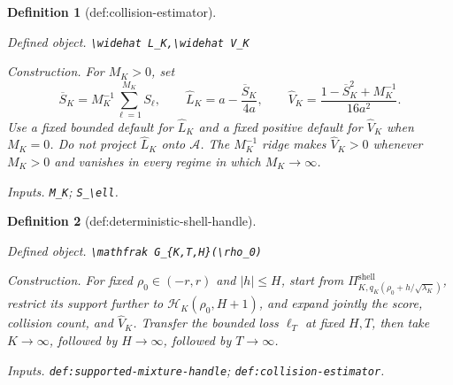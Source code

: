 \documentclass{article}
\newtheorem{definition}{Definition}
\begin{document}
\begin{definition}[def:collision-estimator]\label{def:collision-estimator}
\par\smallskip\noindent\emph{Defined object.} \texttt{\textbackslash{}\allowbreak{}widehat L\_\allowbreak{}K,\allowbreak{}\textbackslash{}\allowbreak{}widehat V\_\allowbreak{}K}
\par\smallskip\noindent\emph{Construction.} For \(M_K>0\), set
\[
 \overline S_K=M_K^{-1}\sum_{\ell=1}^{M_K}S_\ell,\qquad
 \widehat L_K=a-\frac{\overline S_K}{4a},\qquad
 \widehat V_K=\frac{1-\overline S_K^2+M_K^{-1}}{16a^2}.
\]
Use a fixed bounded default for \(\widehat L_K\) and a fixed positive default for \(\widehat V_K\) when \(M_K=0\).  Do not project \(\widehat L_K\) onto \(\mathcal A\).  The \(M_K^{-1}\) ridge makes \(\widehat V_K>0\) whenever \(M_K>0\) and vanishes in every regime in which \(M_K\to\infty\).
\par\smallskip\noindent\emph{Inputs.} \texttt{M\_\allowbreak{}K}; \texttt{S\_\allowbreak{}\textbackslash{}\allowbreak{}ell}.
\end{definition}

\begin{definition}[def:deterministic-shell-handle]\label{def:deterministic-shell-handle}
\par\smallskip\noindent\emph{Defined object.} \texttt{\textbackslash{}\allowbreak{}mathfrak G\_\allowbreak{}\{K,\allowbreak{}T,\allowbreak{}H\}\allowbreak{}(\textbackslash{}\allowbreak{}rho\_\allowbreak{}0)}
\par\smallskip\noindent\emph{Construction.} For fixed \(\rho_0\in(-r,r)\) and \(|h|\le H\), start from \(\Pi_{K,q_K(\rho_0+h/\sqrt{\lambda_K})}^{\mathrm{shell}}\), restrict its support further to \(\mathcal H_K(\rho_0,H+1)\), and expand jointly the score, collision count, and \(\widehat V_K\). Transfer the bounded loss \(\ell_T\) at fixed \(H,T\), then take \(K\to\infty\), followed by \(H\to\infty\), followed by \(T\to\infty\).
\par\smallskip\noindent\emph{Inputs.} \texttt{def:\allowbreak{}supported-\allowbreak{}mixture-\allowbreak{}handle}; \texttt{def:\allowbreak{}collision-\allowbreak{}estimator}.
\end{definition}
\end{document}
